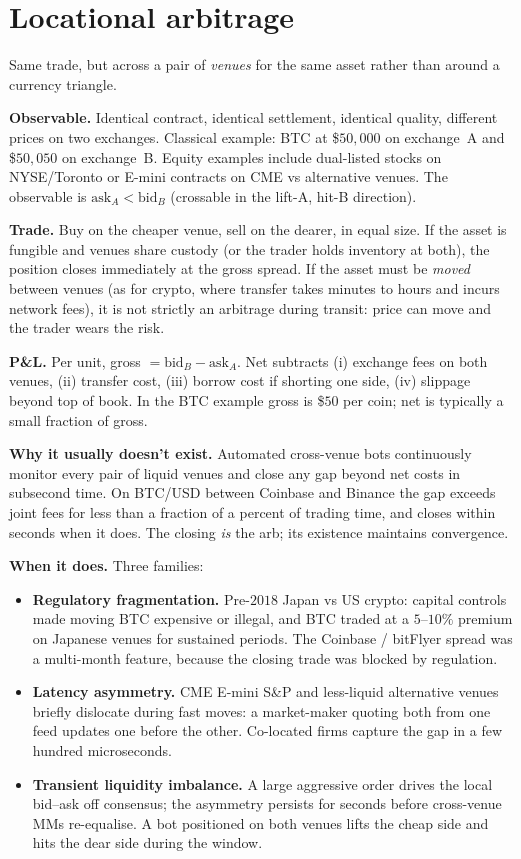 \section{Locational arbitrage}
\label{sec:ch13_locational}

Same trade, but across a pair of \emph{venues} for the same
asset rather than around a currency triangle.

\textbf{Observable.} Identical contract, identical settlement,
identical quality, different prices on two exchanges. Classical
example: BTC at \$$50{,}000$ on exchange~A and \$$50{,}050$ on
exchange~B. Equity examples include dual-listed stocks on
NYSE/Toronto or E-mini contracts on CME vs alternative venues.
The observable is $\text{ask}_{A} < \text{bid}_{B}$ (crossable
in the lift-A, hit-B direction).

\textbf{Trade.} Buy on the cheaper venue, sell on the dearer, in
equal size. If the asset is fungible and venues share custody
(or the trader holds inventory at both), the position closes
immediately at the gross spread. If the asset must be
\emph{moved} between venues (as for crypto, where transfer
takes minutes to hours and incurs network fees), it is not
strictly an arbitrage during transit: price can move and the
trader wears the risk.

\textbf{P\&L.} Per unit, gross $= \text{bid}_{B} -
\text{ask}_{A}$. Net subtracts (i) exchange fees on both venues,
(ii) transfer cost, (iii) borrow cost if shorting one side,
(iv) slippage beyond top of book. In the BTC example gross is
\$$50$ per coin; net is typically a small fraction of gross.

\textbf{Why it usually doesn't exist.} Automated cross-venue
bots continuously monitor every pair of liquid venues and close
any gap beyond net costs in subsecond time. On BTC/USD between
Coinbase and Binance the gap exceeds joint fees for less than a
fraction of a percent of trading time, and closes within
seconds when it does. The closing \emph{is} the arb; its
existence maintains convergence.

\textbf{When it does.} Three families:
\begin{itemize}
  \item \textbf{Regulatory fragmentation.} Pre-$2018$ Japan vs
  US crypto: capital controls made moving BTC expensive or
  illegal, and BTC traded at a $5$--$10\%$ premium on Japanese
  venues for sustained periods. The Coinbase / bitFlyer spread
  was a multi-month feature, because the closing trade was
  blocked by regulation.
  \item \textbf{Latency asymmetry.} CME E-mini S\&P and
  less-liquid alternative venues briefly dislocate during fast
  moves: a market-maker quoting both from one feed updates one
  before the other. Co-located firms capture the gap in a few
  hundred microseconds.
  \item \textbf{Transient liquidity imbalance.} A large
  aggressive order drives the local bid--ask off consensus; the
  asymmetry persists for seconds before cross-venue MMs
  re-equalise. A bot positioned on both venues lifts the cheap
  side and hits the dear side during the window.
\end{itemize}

